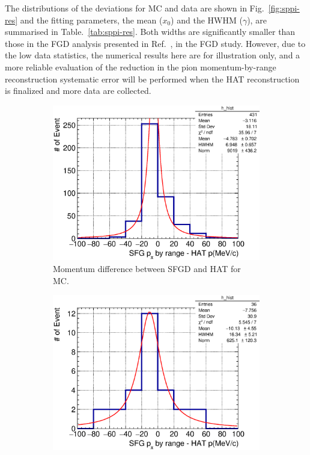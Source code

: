           The distributions of the deviations for MC and data are shown in Fig.~\ref{fig:sppi-res} and the fitting parameters, the mean ($x_0$) and the HWHM ($\gamma$), are summarised in Table.~\ref{tab:sppi-res}.
          Both widths are significantly smaller than those in the FGD analysis presented in Ref.~\cite{Jenkins:2022ljx}, in the FGD study.
          However, due to the low data statistics, the numerical results here are for illustration only, and a more reliable evaluation of the reduction in the pion momentum-by-range reconstruction systematic error will be performed when the HAT reconstruction is finalized and more data are collected.
          \begin{figure}[ht]
          \centering
          \begin{subfigure}{\dbfigwid\textwidth}
          \centering
          \includegraphics[width=\textwidth]{figures/sel/sspi_TOP_pi_mombr_hatp_difhist_al6_mc.eps}
          \caption{Momentum difference between SFGD and HAT for MC.}
          \label{subfig:sfgp-hatp-dif-mc}
          \end{subfigure}
          \hfill
          \begin{subfigure}{\dbfigwid\textwidth}
          \centering
          \includegraphics[width=\textwidth]{figures/sel/sspi_TOP_pi_mombr_hatp_difhist_al4_CombHAT_data.eps}

\end{subfigure}
\end{figure}
